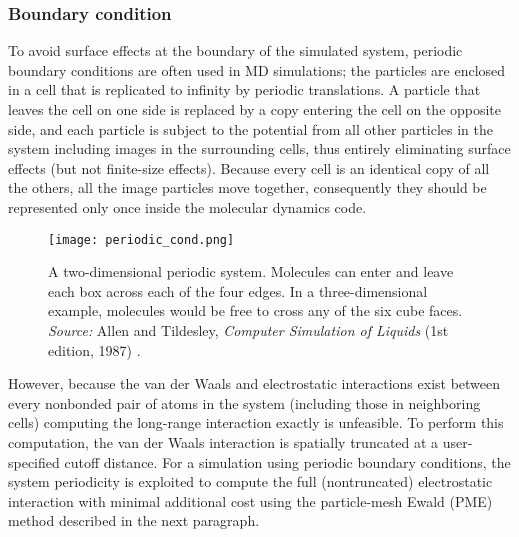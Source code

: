 \vspace{0.25cm}

\subsubsection{Boundary condition}
To avoid surface effects at the boundary of the simulated system, periodic boundary conditions are often used in MD simulations; the particles are enclosed in a cell that is replicated to infinity by periodic translations. A particle that leaves the cell on one side is replaced by a copy entering the cell on the opposite side, and each particle is subject to the potential from all other particles in the system including images in the surrounding cells, thus entirely eliminating surface effects (but not finite-size effects). Because every cell is an identical copy of all the others, all the image particles move together, consequently they should be represented only once inside the molecular dynamics code.
\begin{figure}[H]
\centering
\begin{minipage}[t]{0.75\textwidth}
	\centering
    \texttt{[image: periodic\_cond.png]}
    
    \footnotesize{\caption{A two-dimensional periodic system. Molecules can enter and leave each box across each of the four edges. In a three-dimensional example, molecules would be free to cross any of the six cube faces.
    \textit{Source:} Allen and Tildesley, \textit{Computer Simulation of Liquids} (1st edition, 1987) 
    \cite{ref:AllenTildesley_1ed}.}
    \label{fig:PME}
    }
\end{minipage} 
\end{figure}

However, because the van der Waals and electrostatic interactions exist between every nonbonded pair of atoms in the system (including those in neighboring cells) computing the long-range interaction exactly is unfeasible. To perform this computation, the van der Waals interaction is spatially truncated at a user-specified cutoff distance. For a simulation using periodic boundary conditions, the system periodicity is exploited to compute the full (nontruncated) electrostatic interaction with minimal additional cost using the particle-mesh Ewald (PME) method described in the next paragraph.

\vspace{0.25cm}


